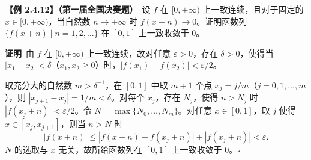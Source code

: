 \documentclass[UTF8,a4paper,11pt]{ctexart}
\newcommand{\ex}[2]{\par\medskip\noindent\textbf{【例 #1】（#2）}\ }
\newcommand{\pf}{\par\noindent\textbf{证明}\ }
\begin{document}
\ex{2.4.12}{第一届全国决赛题}设 $f$ 在 $[0,+\infty)$ 上一致连续，且对于固定的 $x\in[0,+\infty)$，当自然数 $n\to+\infty$ 时 $f(x+n)\to0$。证明函数列 $\{f(x+n)\mid n=1,2,\ldots\}$ 在 $[0,1]$ 上一致收敛于 $0$。
\pf 由 $f$ 在 $[0,+\infty)$ 上一致连续，故对任意 $\varepsilon>0$，存在 $\delta>0$，使得当 $|x_1-x_2|<\delta$（$x_1,x_2\ge0$）时，$|f(x_1)-f(x_2)|<\varepsilon/2$。

取充分大的自然数 $m>\delta^{-1}$，在 $[0,1]$ 中取 $m+1$ 个点 $x_j=j/m$（$j=0,1,\ldots,m$），则 $|x_{j+1}-x_j|=1/m<\delta$。对每个 $x_j$，存在 $N_j$，使得 $n>N_j$ 时 $|f(x_j+n)|<\varepsilon/2$。令 $N=\max\{N_0,\ldots,N_m\}$。对任意 $x\in[0,1]$，取 $j$ 使得 $x\in[x_j,x_{j+1}]$，则当 $n>N$ 时
\[
|f(x+n)|\le|f(x+n)-f(x_j+n)|+|f(x_j+n)|<\varepsilon.
\]
$N$ 的选取与 $x$ 无关，故所给函数列在 $[0,1]$ 上一致收敛于 $0$。\hfill$\square$
\end{document}
